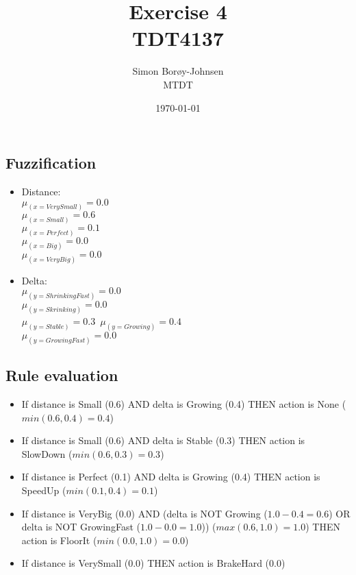 \documentclass{article}
\begin{document}
\title{\textbf{Exercise 4} \\ TDT4137}
\author{Simon Borøy-Johnsen \\ MTDT}
\date{\today}
\maketitle
\clearpage


\section{}
\subsection*{Fuzzification}
\begin{itemize}
    \item Distance:\\
        $\mu_{(x=VerySmall)}=0.0$\\
        $\mu_{(x=Small)}=0.6$\\
        $\mu_{(x=Perfect)}=0.1$\\
        $\mu_{(x=Big)}=0.0$\\
        $\mu_{(x=VeryBig)}=0.0$
    \item Delta:\\
        $\mu_{(y=ShrinkingFast)}=0.0$\\
        $\mu_{(y=Skrinking)}=0.0$\\
        $\mu_{(y=Stable)}=0.3$\
        $\mu_{(y=Growing)}=0.4$\\
        $\mu_{(y=GrowingFast)}=0.0$
\end{itemize}
        
\subsection*{Rule evaluation}
\begin{itemize}
    \item If distance is Small (0.6) AND delta is Growing (0.4) THEN action is None ($min(0.6, 0.4) = 0.4$)
    \item If distance is Small (0.6) AND delta is Stable (0.3) THEN action is SlowDown ($min(0.6, 0.3) = 0.3$)
    \item If distance is Perfect (0.1) AND delta is Growing (0.4) THEN action is SpeedUp ($min(0.1, 0.4) = 0.1$)
    \item If distance is VeryBig (0.0) AND (delta is NOT Growing ($1.0-0.4=0.6$) OR delta is NOT GrowingFast ($1.0-0.0=1.0$)) ($max(0.6, 1.0) = 1.0$)
    THEN action is FloorIt ($min(0.0, 1.0) = 0.0$)
    \item If distance is VerySmall (0.0) THEN action is BrakeHard (0.0)
\end{itemize}
\end{document}
